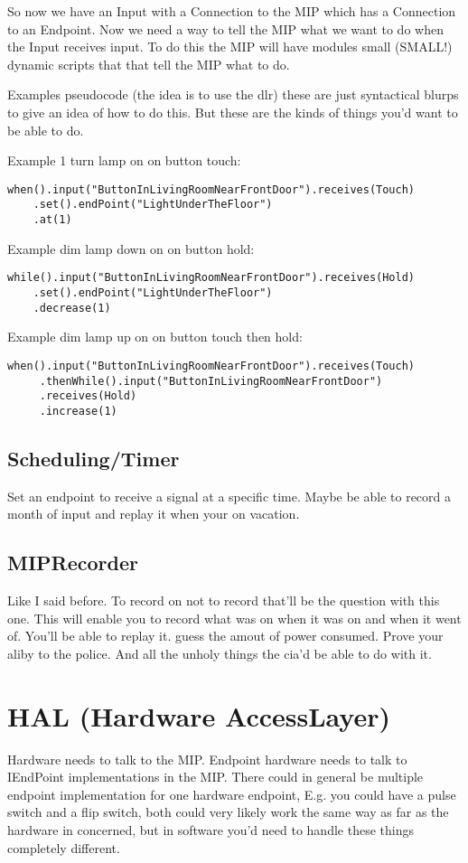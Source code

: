 \documentclass[a4paper]{article}
\begin{document}
So now we have an Input with a Connection to the MIP which has a Connection to an Endpoint. Now we need a way to tell the MIP what we want to do when the Input receives input. To do this the MIP will have modules small (SMALL!) dynamic scripts that that tell the MIP what to do. 

Examples pseudocode (the idea is to use the dlr) these are just syntactical blurps to give an idea of how to do this. But these are the kinds of things you'd want to be able to do.

Example 1 turn lamp on on button touch:
\begin{verbatim}
when().input("ButtonInLivingRoomNearFrontDoor").receives(Touch)
    .set().endPoint("LightUnderTheFloor")
    .at(1)
\end{verbatim}

Example dim lamp down on on button hold:
\begin{verbatim}
while().input("ButtonInLivingRoomNearFrontDoor").receives(Hold)
    .set().endPoint("LightUnderTheFloor")
    .decrease(1)
\end{verbatim}

Example dim lamp up on on button touch then hold:
\begin{verbatim}
when().input("ButtonInLivingRoomNearFrontDoor").receives(Touch)
     .thenWhile().input("ButtonInLivingRoomNearFrontDoor")
     .receives(Hold)
     .increase(1)
\end{verbatim}
 
\subsection{Scheduling/Timer}
Set an endpoint to receive a signal at a specific time. Maybe be able to record a month of input and replay it when your on vacation.

\subsection{MIPRecorder}
Like I said before. To record on not to record that'll be the question with this one. This will enable you to record what was on when it was on and when it went of. You'll be able to replay it. guess the amout of power consumed. Prove your aliby to the police. And all the unholy things the cia'd be able to do with it.

\section{HAL (Hardware AccessLayer)}
Hardware needs to talk to the MIP. Endpoint hardware needs to talk to IEndPoint implementations in the MIP. There could in general be multiple endpoint implementation for one hardware endpoint, E.g. you could have a pulse switch and a flip switch, both could very likely work the same way as far as the hardware in concerned, but in software you'd need to handle these things completely different. 
\end{document}
